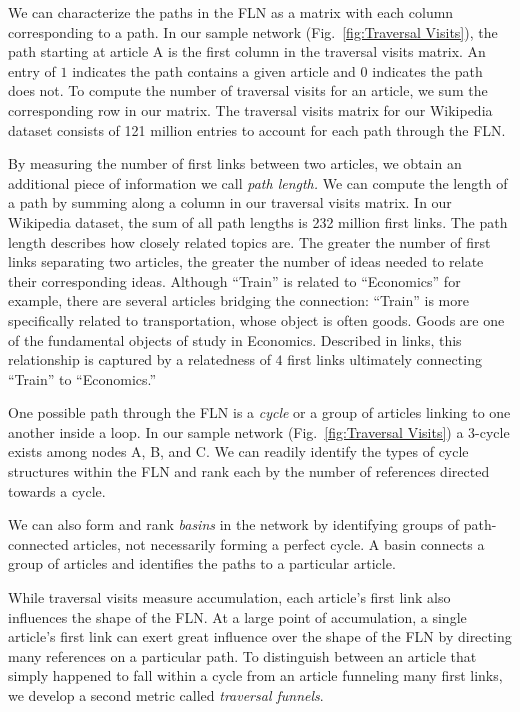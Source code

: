 \documentclass[pre,twocolumn,twoside,superscriptaddress,floatfix, aps, 10pt]{revtex4-1}
\begin{document}
We can characterize the paths in the FLN as a matrix with each column corresponding to a path. In our sample network 
(Fig.~\ref{fig:Traversal Visits}), the path starting at article A is the 
first column in the traversal visits matrix. 
An entry of $1$ indicates the path contains a given article and 
$0$ indicates the path does not.
To compute the number of traversal visits for an article, we sum the corresponding row in our matrix.
The traversal visits matrix for 
our Wikipedia dataset consists of 121 million entries to account for each path through the FLN. 

By measuring the number of first links between
two articles, we obtain an additional piece of information we call 
{\it path length.} We can compute the length of a path by summing 
along a column in our traversal visits matrix. 
In our Wikipedia dataset, the sum of all path lengths is 232 million first links.
The path length describes how closely related topics are.
The greater the number of first links separating two articles, the greater the number of ideas needed to relate their corresponding ideas. Although
``Train'' is related to ``Economics'' for example, there are several articles
bridging the connection:
``Train'' is more specifically related to transportation, whose object
is often goods. Goods are one of the fundamental objects of study in Economics.
Described in links, this relationship is captured by a relatedness of $4$ 
first links ultimately connecting ``Train'' to ``Economics.'' 

One possible path through the FLN is a {\it cycle} or a group of articles 
linking to one another inside a loop. In our sample network 
(Fig.~\ref{fig:Traversal Visits}) 
a 3-cycle exists among nodes A, B, and C. 
We can readily identify
the types of cycle structures within the FLN
and rank each by 
the number of references directed towards a cycle. 


We can also form and rank {\it basins} in the network by identifying groups of 
path-connected articles, not necessarily forming a perfect cycle.
A basin connects a group of articles and identifies the paths 
to a particular article.

While traversal visits measure accumulation, each article's first link also 
influences the shape of the FLN. 
At a large point of accumulation, a single article's first link 
can exert great influence over the shape of the FLN by directing many
references on a particular path. To distinguish between an article 
that simply happened to fall within a cycle from an article funneling 
many first links, we develop a second metric called {\it traversal funnels}.
\end{document}
